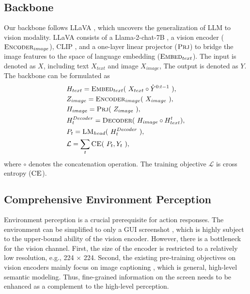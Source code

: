 \subsection{Backbone}
Our backbone follows LLaVA \cite{liu2023llava}, which uncovers the generalization of LLM to vision modality. LLaVA consists of a Llama-2-chat-7B \cite{touvron2023llama2}, a vision encoder ($\textsc{Encoder}_{image}$), CLIP \cite{Radford2021LearningTV}, and a one-layer linear projector ($\textsc{Prj}$) to bridge the image features to the space of language embedding ($\textsc{Embed}_{text}$). 
The input is denoted as $X$, including text $X_{text}$ and image $X_{image}$, The output is denoted as $Y$.
The backbone can be formulated as 
\begin{equation}
\begin{split}
& {H}_{text} = \textsc{Embed}_{text} \textup{( } {X}_{text} \circ \hat{Y}^{0:t-1} \textup{ )}, \\
& {Z}_{image} = \textsc{Encoder}_{image} \textup{( } {X}_{image} \textup{ )}, \\
& {H}_{image} = \textsc{Prj} \textup{( } {Z}_{image} \textup{ )}, \\
& {H}_{t}^{Decoder} = \textsc{Decoder} \textup{( } {H}_{image} \circ {H}_{text}^{t} ),\\
& {P}_{t} = \textsc{LM}_{head} \textup{( } {H}_{t}^{Decoder} \textup{ )},\\
& \mathcal{L} = \sum_{t} \textsc{CE} \textup{( } {P}_{t} , {Y}_{t} \textup{ )},
\end{split}
\label{llama}
\end{equation}
where $\circ$ denotes the concatenation operation. The training objective $\mathcal{L}$ is cross entropy ($\textsc{CE}$).

\subsection{Comprehensive Environment Perception}
Environment perception is a crucial prerequisite for action responses.
The environment can be simplified to only a GUI screenshot \cite{zhang2023you}, which is highly subject to the upper-bound ability of the vision encoder.
However, there is a bottleneck for the vision channel. 
First, the size of the encoder is restricted to a relatively low resolution, e.g., 224 $\times$ 224. 
Second, the existing pre-training objectives on vision encoders mainly focus on image captioning \cite{Radford2021LearningTV, li2023blip}, which is general, high-level semantic modeling. 
Thus, fine-grained information on the screen needs to be enhanced as a complement to the high-level perception.


